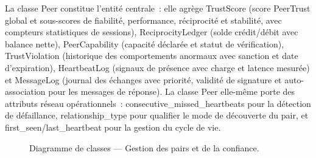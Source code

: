 La classe {Peer} constitue l'entité centrale~: elle agrège {TrustScore} (score PeerTrust global et sous-scores de fiabilité, performance, réciprocité et stabilité, avec compteurs statistiques de sessions), {ReciprocityLedger} (solde crédit/débit avec balance nette), {PeerCapability} (capacité déclarée et statut de vérification), {TrustViolation} (historique des comportements anormaux avec sanction et date d'expiration), {HeartbeatLog} (signaux de présence avec charge et latence mesurée) et {MessageLog} (journal des échanges avec priorité, validité de signature et auto-association pour les messages de réponse). La classe {Peer} elle-même porte des attributs réseau opérationnels~: {consecutive\_missed\_heartbeats} pour la détection de défaillance, {relationship\_type} pour qualifier le mode de découverte du pair, et {first\_seen}/{last\_heartbeat} pour la gestion du cycle de vie.

\begin{figure}[H]
\centering
{}
\caption{Diagramme de classes — Gestion des pairs et de la confiance.}
\label{fig:class_peers}
\end{figure}

